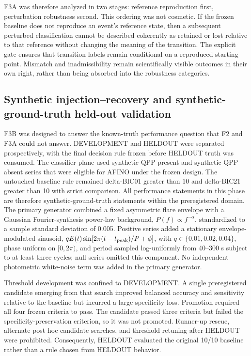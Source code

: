 \documentclass[11pt,a4paper]{article}
\begin{document}
F3A was therefore analyzed in two stages: reference reproduction first, perturbation robustness second. This ordering was not cosmetic. If the frozen baseline does not reproduce an event's reference state, then a subsequent perturbed classification cannot be described coherently as retained or lost relative to that reference without changing the meaning of the transition. The explicit gate ensures that transition labels remain conditional on a reproduced starting point. Mismatch and inadmissibility remain scientifically visible outcomes in their own right, rather than being absorbed into the robustness categories.

\subsection{Synthetic injection--recovery and synthetic-ground-truth held-out validation}
F3B was designed to answer the known-truth performance question that F2 and F3A could not answer. DEVELOPMENT and HELDOUT were separated prospectively, with the final decision rule frozen before HELDOUT truth was consumed. The classifier plane used synthetic QPP-present and synthetic QPP-absent series that were eligible for AFINO under the frozen design. The untouched baseline rule remained delta-BIC01 greater than 10 and delta-BIC21 greater than 10 with strict comparison. All performance statements in this phase are therefore synthetic-ground-truth statements within the preregistered domain. The primary generator combined a fixed asymmetric flare envelope with a Gaussian Fourier-synthesis power-law background, $P(f)\propto f^{-\alpha}$, standardized to a sample standard deviation of 0.005. Positive series added a stationary envelope-modulated sinusoid, $qE(t)\sin[2\pi(t-t_{\rm peak})/P+\phi]$, with $q\in\{0.01,0.02,0.04\}$, phase uniform on $[0,2\pi)$, and period sampled log-uniformly from 40--300 s subject to at least three cycles; null series omitted this component. No independent photometric white-noise term was added in the primary generator.

Threshold development was confined to DEVELOPMENT. A single preregistered candidate emerging from that search improved balanced accuracy and sensitivity relative to the baseline but incurred a large specificity loss. Promotion required all four frozen criteria to pass. The candidate passed three criteria but failed the specificity-preservation criterion, so it was not promoted. Runner-up rescue, alternate post hoc candidate searches, and threshold retuning after HELDOUT were prohibited. Consequently, HELDOUT evaluated the original 10/10 baseline rather than a rule chosen from HELDOUT behavior.
\end{document}
